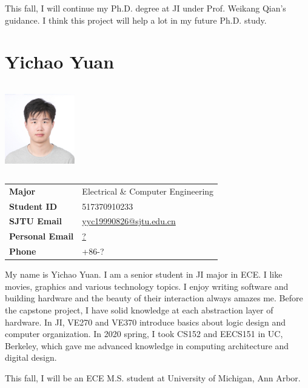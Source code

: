 This fall, I will continue my Ph.D. degree at JI under Prof. Weikang Qian's guidance. I think this project will help a lot in my future Ph.D. study.


\section{Yichao Yuan}

\begin{minipage}{0.25\textwidth}
  \includegraphics[width=1.2in,height=1.5in,clip,keepaspectratio]{figure/yyc.jpg}
\end{minipage}
\begin{minipage}{0.75\textwidth}\raggedright
  \begin{tabular}{l l}
    \textbf{Major}          & Electrical \& Computer Engineering \\
    \textbf{Student ID}     & 517370910233 \\
    \textbf{SJTU Email}     & \url{yyc19990826@sjtu.edu.cn} \\
    \textbf{Personal Email} & \url{?} \\
    \textbf{Phone}          & +86-?
  \end{tabular}
\end{minipage}

My name is Yichao Yuan. I am a senior student in JI major in ECE. I like movies, graphics and various technology topics. I enjoy writing software and building hardware and the beauty of their interaction always amazes me. Before the capstone project, I have solid knowledge at each abstraction layer of hardware. In JI, VE270 and VE370 introduce basics about logic design and computer organization. In 2020 spring, I took CS152 and EECS151 in UC, Berkeley, which gave me advanced knowledge in computing architecture and digital design.

This fall, I will be an ECE M.S. student at University of Michigan, Ann Arbor.
